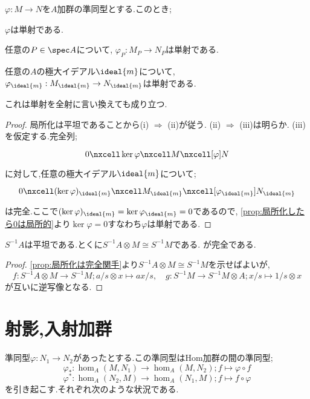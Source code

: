 \begin{prop}\label{prop:局所的性質}
	$\varphi:M\to N$を$A$加群の準同型とする.このとき;
	\begin{sakura}
		\item $\varphi$は単射である.
		\item 任意の$P\in\spec A$について, $\varphi_P:M_P\to N_P$は単射である.
		\item 任意の$A$の極大イデアル$\ideal{m}$について, 
		$\varphi_{\ideal{m}}:M_{\ideal{m}}\to N_{\ideal{m}}$は単射である.
	\end{sakura}
	これは単射を全射に言い換えても成り立つ.
\end{prop}

\begin{proof}
	局所化は平坦であることから(i) $\Longrightarrow$ (ii)が従う. (ii) $\Longrightarrow$ (iii)は明らか. (iii)を仮定する.完全列;
	\[\begin{tikzcd}
	0\nxcell\ker\varphi\nxcell M\nxcell[\varphi]N
	\end{tikzcd}\]
	に対して,任意の極大イデアル$\ideal{m}$について;
	\[\begin{tikzcd}
	0\nxcell(\ker\varphi)_{\ideal{m}}\nxcell M_{\ideal{m}}\nxcell[\varphi_{\ideal{m}}]N_{\ideal{m}}
	\end{tikzcd}\]
	は完全.ここで$(\ker\varphi)_{\ideal{m}}=\ker\varphi_{\ideal{m}}=0$であるので, \ref{prop:局所化したら0は局所的}より$\ker\varphi=0$すなわち$\varphi$は単射である.
\end{proof}

\begin{prop}\label{prop:局所化は平坦}
	$S^{-1}A$は平坦である.とくに$S^{-1}A\otimes M\cong S^{-1}M$である.
	が完全である.
\end{prop}

\begin{proof}
	\ref{prop:局所化は完全関手}より$S^{-1}A\otimes M\cong S^{-1}M$を示せばよいが,	
	\[f:S^{-1}A\otimes M\to S^{-1}M;a/s\otimes x\mapsto ax/s,\quad g:S^{-1}M\to S^{-1}M\otimes A;x/s\mapsto 1/s\otimes x\]
	が互いに逆写像となる.
\end{proof}
\section{射影,入射加群}

準同型$\varphi:N_1\to N_2$があったとする.この準同型はHom加群の間の準同型;
\[\varphi_\ast :\hom_A(M,N_1)\to\hom_A(M,N_2);f\mapsto \varphi\circ f\]
\[\varphi^\ast :\hom_A(N_2,M)\to\hom_A(N_1,M);f\mapsto f\circ \varphi\]
を引き起こす.それぞれ次のような状況である.

